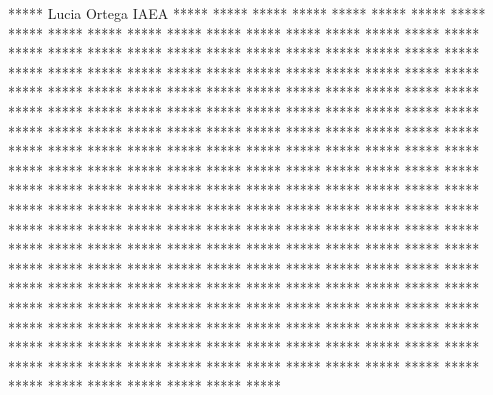 \begin{conf-abstract}
{*****}
{Lucia Ortega}
{IAEA}
{***** ***** ***** ***** ***** ***** ***** ***** ***** ***** ***** ***** ***** ***** ***** ***** ***** ***** ***** ***** ***** ***** ***** ***** ***** ***** ***** ***** ***** ***** ***** ***** ***** ***** ***** ***** ***** ***** ***** ***** ***** ***** ***** ***** ***** ***** ***** ***** ***** ***** ***** ***** ***** ***** ***** ***** ***** ***** ***** ***** ***** ***** ***** ***** ***** ***** ***** ***** ***** ***** ***** ***** ***** ***** ***** ***** ***** ***** ***** ***** ***** ***** ***** ***** ***** ***** ***** ***** ***** ***** ***** ***** ***** ***** ***** ***** ***** ***** ***** ***** ***** ***** ***** ***** ***** ***** ***** ***** ***** ***** ***** ***** ***** ***** ***** ***** ***** ***** ***** ***** ***** ***** ***** ***** ***** ***** ***** ***** ***** ***** ***** ***** ***** ***** ***** ***** ***** ***** ***** ***** ***** ***** ***** ***** ***** ***** ***** ***** ***** ***** ***** ***** ***** ***** ***** ***** ***** ***** ***** ***** ***** ***** ***** ***** ***** ***** ***** ***** ***** ***** ***** ***** ***** ***** ***** ***** ***** ***** ***** ***** ***** ***** ***** ***** ***** ***** ***** ***** ***** ***** ***** ***** ***** ***** ***** ***** ***** ***** ***** ***** ***** ***** ***** ***** ***** ***** ***** ***** ***** ***** ***** ***** ***** ***** ***** ***** ***** ***** ***** ***** ***** ***** ***** ***** ***** ***** ***** ***** ***** ***** *****}

\end{conf-abstract}

